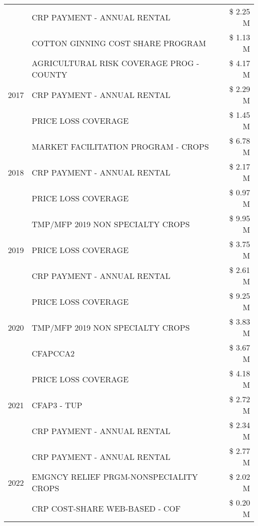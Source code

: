 \begin{tabular}{llr}
 & CRP PAYMENT - ANNUAL RENTAL & \$ 2.25 M \\
 & COTTON GINNING COST SHARE PROGRAM & \$ 1.13 M \\
\cline{1-3}
\multirow[t]{3}{*}{2017} & AGRICULTURAL RISK COVERAGE PROG - COUNTY & \$ 4.17 M \\
 & CRP PAYMENT - ANNUAL RENTAL & \$ 2.29 M \\
 & PRICE LOSS COVERAGE & \$ 1.45 M \\
\cline{1-3}
\multirow[t]{3}{*}{2018} & MARKET FACILITATION PROGRAM - CROPS & \$ 6.78 M \\
 & CRP PAYMENT - ANNUAL RENTAL & \$ 2.17 M \\
 & PRICE LOSS COVERAGE & \$ 0.97 M \\
\cline{1-3}
\multirow[t]{3}{*}{2019} & TMP/MFP 2019 NON SPECIALTY CROPS & \$ 9.95 M \\
 & PRICE LOSS COVERAGE & \$ 3.75 M \\
 & CRP PAYMENT - ANNUAL RENTAL & \$ 2.61 M \\
\cline{1-3}
\multirow[t]{3}{*}{2020} & PRICE LOSS COVERAGE & \$ 9.25 M \\
 & TMP/MFP 2019 NON SPECIALTY CROPS & \$ 3.83 M \\
 & CFAPCCA2 & \$ 3.67 M \\
\cline{1-3}
\multirow[t]{3}{*}{2021} & PRICE LOSS COVERAGE & \$ 4.18 M \\
 & CFAP3 - TUP & \$ 2.72 M \\
 & CRP PAYMENT - ANNUAL RENTAL & \$ 2.34 M \\
\cline{1-3}
\multirow[t]{3}{*}{2022} & CRP PAYMENT - ANNUAL RENTAL & \$ 2.77 M \\
 & EMGNCY RELIEF PRGM-NONSPECIALITY CROPS & \$ 2.02 M \\
 & CRP COST-SHARE WEB-BASED - COF & \$ 0.20 M \\
\cline{1-3}
\bottomrule
\end{tabular}

